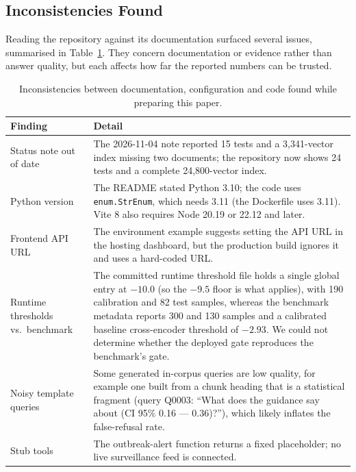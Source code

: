 \documentclass[10pt,a4paper]{article}
\newcommand{\code}[1]{\texttt{\small #1}}
\begin{document}
\subsection{Inconsistencies Found}
Reading the repository against its documentation surfaced several issues, summarised in Table~\ref{tab:defects}. They concern documentation or evidence rather than answer quality, but each affects how far the reported numbers can be trusted.

\begin{table}[t]
\centering\small
\caption{Inconsistencies between documentation, configuration and code found while preparing this paper.}
\label{tab:defects}
\begin{tabular}{p{5.2cm}p{9.3cm}}
\toprule
Finding & Detail\\
\midrule
Status note out of date & The 2026-11-04 note reported 15 tests and a 3,341-vector index missing two documents; the repository now shows 24 tests and a complete 24,800-vector index.\\
Python version & The README stated Python 3.10; the code uses \code{enum.StrEnum}, which needs 3.11 (the Dockerfile uses 3.11). Vite 8 also requires Node 20.19 or 22.12 and later.\\
Frontend API URL & The environment example suggests setting the API URL in the hosting dashboard, but the production build ignores it and uses a hard-coded URL.\\
Runtime thresholds vs.\ benchmark & The committed runtime threshold file holds a single global entry at $-10.0$ (so the $-9.5$ floor is what applies), with 190 calibration and 82 test samples, whereas the benchmark metadata reports 300 and 130 samples and a calibrated baseline cross-encoder threshold of $-2.93$. We could not determine whether the deployed gate reproduces the benchmark's gate.\\
Noisy template queries & Some generated in-corpus queries are low quality, for example one built from a chunk heading that is a statistical fragment (query Q0003: ``What does the guidance say about (CI 95\% 0.16 --- 0.36)?''), which likely inflates the false-refusal rate.\\
Stub tools & The outbreak-alert function returns a fixed placeholder; no live surveillance feed is connected.\\
\bottomrule
\end{tabular}
\end{table}

\end{document}
